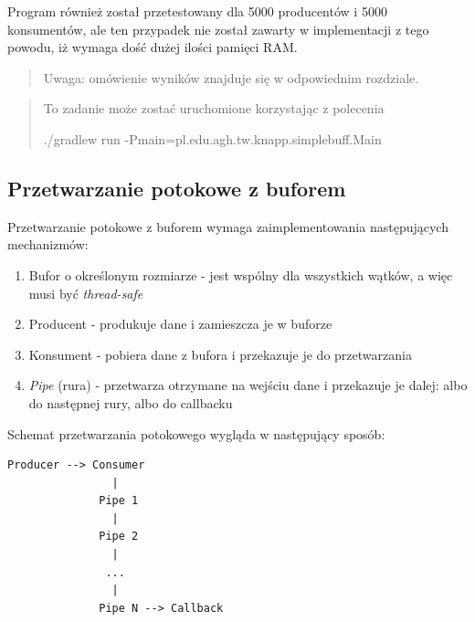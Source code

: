 \documentclass[11pt]{article}
\providecommand{\tightlist}{%
      \setlength{\itemsep}{0pt}\setlength{\parskip}{0pt}}
\newenvironment{Shaded}{}{}
\newcommand{\NormalTok}[1]{{#1}}
\newcommand{\OperatorTok}[1]{\textcolor[rgb]{0.40,0.40,0.40}{{#1}}}
\newcommand{\ExtensionTok}[1]{{#1}}
\newcommand{\AttributeTok}[1]{\textcolor[rgb]{0.49,0.56,0.16}{{#1}}}
\begin{document}
Program również został przetestowany dla 5000 producentów i 5000
konsumentów, ale ten przypadek nie został zawarty w implementacji z tego
powodu, iż wymaga dość dużej ilości pamięci RAM.

\begin{quote}
Uwaga: omówienie wyników znajduje się w odpowiednim rozdziale.
\end{quote}

\begin{quote}
To zadanie może zostać uruchomione korzystając z polecenia

\begin{Shaded}
\begin{Highlighting}[]
\ExtensionTok{./gradlew}\NormalTok{ run }\AttributeTok{{-}Pmain}\OperatorTok{=}\NormalTok{pl.edu.agh.tw.knapp.simplebuff.Main}
\end{Highlighting}
\end{Shaded}
\end{quote}

    \hypertarget{przetwarzanie-potokowe-z-buforem}{%
\subsection{Przetwarzanie potokowe z
buforem}\label{przetwarzanie-potokowe-z-buforem}}

Przetwarzanie potokowe z buforem wymaga zaimplementowania następujących
mechanizmów:

\begin{enumerate}
\def\labelenumi{\arabic{enumi}.}
\tightlist
\item
  Bufor o określonym rozmiarze - jest wspólny dla wszystkich wątków, a
  więc musi być \emph{thread-safe}
\item
  Producent - produkuje dane i zamieszcza je w buforze
\item
  Konsument - pobiera dane z bufora i przekazuje je do przetwarzania
\item
  \emph{Pipe} (rura) - przetwarza otrzymane na wejściu dane i przekazuje
  je dalej: albo do następnej rury, albo do callbacku
\end{enumerate}

Schemat przetwarzania potokowego wygląda w następujący sposób:

\begin{verbatim}
Producer --> Consumer
                |
              Pipe 1
                |
              Pipe 2
                |
               ...
                |
              Pipe N --> Callback
\end{verbatim}
\end{document}
